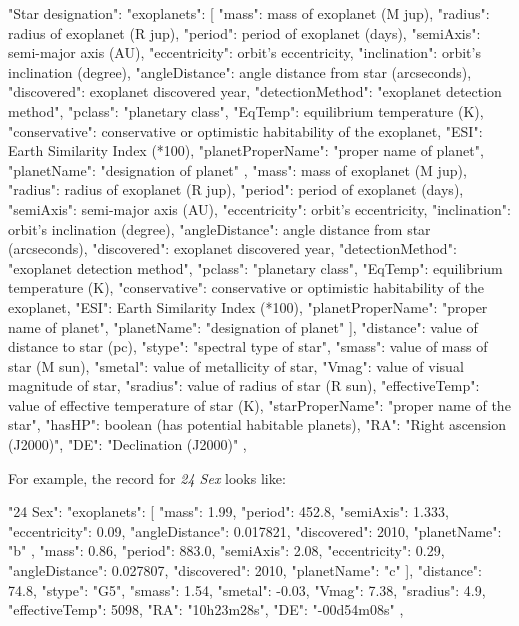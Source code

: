 \begin{configfile}
"Star designation":
{
	"exoplanets":
	[
	{
		"mass": mass of exoplanet (M jup),
		"radius": radius of exoplanet (R jup),
		"period": period of exoplanet (days),
		"semiAxis": semi-major axis (AU),
		"eccentricity": orbit's eccentricity,
		"inclination": orbit's inclination (degree),
		"angleDistance": angle distance from star 
		                 (arcseconds),
		"discovered": exoplanet discovered year,
		"detectionMethod": "exoplanet detection method",
		"pclass": "planetary class",
		"EqTemp": equilibrium temperature (K),
		"conservative": conservative or optimistic 
		                habitability of the exoplanet,
		"ESI": Earth Similarity Index (*100),
		"planetProperName": "proper name of planet",
		"planetName": "designation of planet"
	},
	{
		"mass": mass of exoplanet (M jup),
		"radius": radius of exoplanet (R jup),
		"period": period of exoplanet (days),
		"semiAxis": semi-major axis (AU),
		"eccentricity": orbit's eccentricity,
		"inclination": orbit's inclination (degree),
		"angleDistance": angle distance from star 
		                 (arcseconds),
		"discovered": exoplanet discovered year,
		"detectionMethod": "exoplanet detection method",
		"pclass": "planetary class",
		"EqTemp": equilibrium temperature (K),
		"conservative": conservative or optimistic 
		                habitability of the exoplanet,
		"ESI": Earth Similarity Index (*100),
		"planetProperName": "proper name of planet",
		"planetName": "designation of planet"
	}
	],
	"distance": value of distance to star (pc),
	"stype": "spectral type of star",
	"smass": value of mass of star (M sun),
	"smetal": value of metallicity of star,
	"Vmag": value of visual magnitude of star,
	"sradius": value of radius of star (R sun),
	"effectiveTemp": value of effective temperature 
	                 of star (K),
	"starProperName": "proper name of the star",
	"hasHP": boolean (has potential habitable planets),
	"RA": "Right ascension (J2000)",
	"DE": "Declination (J2000)"
},
\end{configfile}

\noindent For example, the record for \textit{24 Sex} looks like:
\begin{configfile}
"24 Sex":
{
		"exoplanets":
		[
		{
			"mass": 1.99,
			"period": 452.8,
			"semiAxis": 1.333,
			"eccentricity": 0.09,
			"angleDistance": 0.017821,
			"discovered": 2010,
			"planetName": "b"
		},
		{
			"mass": 0.86,
			"period": 883.0,
			"semiAxis": 2.08,
			"eccentricity": 0.29,
			"angleDistance": 0.027807,
			"discovered": 2010,
			"planetName": "c"
		}
		],
		"distance": 74.8,
		"stype": "G5",
		"smass": 1.54,
		"smetal": -0.03,
		"Vmag": 7.38,
		"sradius": 4.9,
		"effectiveTemp": 5098,
		"RA": "10h23m28s",
		"DE": "-00d54m08s"
},
\end{configfile}


